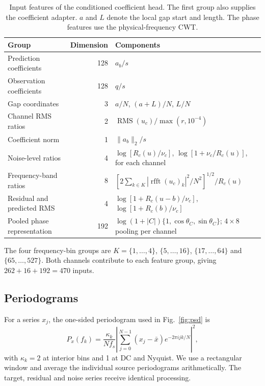 \documentclass[10pt,prd,aps,a4paper,twocolumn,superscriptaddress,nofootinbib,floatfix]{revtex4-2}
\begin{document}
\begin{table}[t]\centering
\caption{Input features of the conditioned coefficient head. The first group also supplies the coefficient adapter. $a$ and $L$ denote the local gap start and length. The phase features use the physical-frequency CWT.}\label{tab:head_features}
\begin{tabular}{lrl}\hline\hline
Group & Dimension & Components\\\hline
Prediction coefficients & 128 & $a_b/s$\\
Observation coefficients & 128 & $q/s$\\
Gap coordinates & 3 & $a/N$, $(a+L)/N$, $L/N$\\
Channel RMS ratios & 2 & $\operatorname{RMS}(u_c)/\max(r,10^{-4})$\\
Coefficient norm & 1 & $\|a_b\|_2/s$\\\hline
Noise-level ratios & 4 & $\log[R_c(u)/\nu_c]$, $\log[1+\nu_c/R_c(u)]$, for each channel\\
Frequency-band ratios & 8 & $[2\sum_{k\in K}|\operatorname{rfft}(u_c)_k|^2/N^2]^{1/2}/R_c(u)$\\
Residual and predicted RMS & 4 & $\log[1+R_c(u-b)/\nu_c]$, $\log[1+R_c(b)/\nu_c]$\\\hline
Pooled phase representation & 192 & $\log(1+|C|)\{1,\cos\theta_C,\sin\theta_C\}$; $4\times8$ pooling per channel\\
\hline\hline\end{tabular}

\smallskip\parbox{0.96\textwidth}{The four frequency-bin groups are $K=\{1,\ldots,4\}$, $\{5,\ldots,16\}$, $\{17,\ldots,64\}$ and $\{65,\ldots,527\}$. Both channels contribute to each feature group, giving $262+16+192=470$ inputs.}
\end{table}

\subsection{Periodograms}
For a series $x_j$, the one-sided periodogram used in Fig.~\ref{fig:psd} is
\begin{equation}
P_x(f_k)=\frac{\kappa_k}{Nf_s}\left|\sum_{j=0}^{N-1}(x_j-\bar x)e^{-2\pi i jk/N}\right|^2,
\end{equation}
with $\kappa_k=2$ at interior bins and 1 at DC and Nyquist. We use a rectangular window and average the individual source periodograms arithmetically. The target, residual and noise series receive identical processing.
\end{document}
